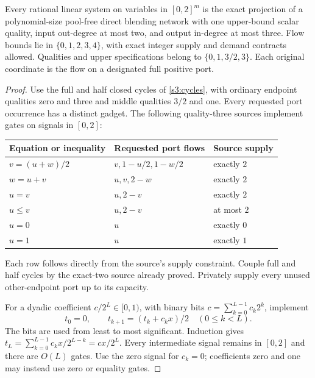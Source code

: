 \begin{lemma}\label{s3:linear-circuits}
Every rational linear system on variables in $[0,2]^m$ is the exact
projection of a polynomial-size pool-free direct blending network with
one upper-bound scalar quality, input out-degree at most two, and output
in-degree at most three. Flow bounds lie in $\{0,1,2,3,4\}$, with exact
integer supply and demand contracts allowed. Qualities and upper
specifications belong to $\{0,1,3/2,3\}$. Each original coordinate
is the flow on a designated full positive port.
\end{lemma}
\begin{proof}
Use the full and half closed cycles of \cref{s3:cycles}, with ordinary
endpoint qualities zero and three and middle qualities $3/2$ and one.
Every requested port occurrence has a distinct gadget. The following
quality-three sources implement gates on signals in $[0,2]$:
\begin{center}
\begin{tabular}{lll}
\toprule
Equation or inequality & Requested port flows & Source supply\\
\midrule
$v=(u+w)/2$ & $v,1-u/2,1-w/2$ & exactly $2$\\
$w=u+v$ & $u,v,2-w$ & exactly $2$\\
$u=v$ & $u,2-v$ & exactly $2$\\
$u\le v$ & $u,2-v$ & at most $2$\\
$u=0$ & $u$ & exactly $0$\\
$u=1$ & $u$ & exactly $1$\\
\bottomrule
\end{tabular}
\end{center}
Each row follows directly from the source's supply constraint. Couple
full and half cycles by the exact-two source already proved. Privately
supply every unused other-endpoint port up to its capacity.

For a dyadic coefficient $c/2^L\in[0,1)$, with binary bits
$c=\sum_{k=0}^{L-1}c_k2^k$, implement
\begin{equation}
 t_0=0,\qquad t_{k+1}=(t_k+c_kx)/2\quad(0\le k<L).
 \label{s3:binary-multiplier}
\end{equation}
The bits are used from least to most significant. Induction gives
$t_L=\sum_{k=0}^{L-1}c_kx/2^{L-k}=cx/2^L$.
Every intermediate signal remains in $[0,2]$ and there are $O(L)$ gates.
Use the zero signal for $c_k=0$; coefficients zero and one may instead
use zero or equality gates.


\end{proof}
